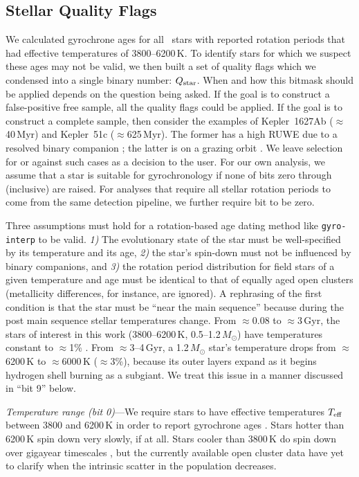 \documentclass[11pt,twocolumn,tighten]{aastex63}
\begin{document}
\subsection{Stellar Quality Flags}
\label{subsec:flags}
We calculated gyrochrone ages for all \nuniqstarsantosrotteffcut\
stars with reported rotation periods that had effective temperatures
of 3800--6200\,K.  To identify stars for which we suspect these ages
may not be valid, we then built a set of quality flags which we
condensed into a single binary number: $Q_{\rm star}$.  When and how
this bitmask should be applied depends on the question being asked.
If the goal is to construct a false-positive free sample, all the
quality flags could be applied.  If the goal is to construct a
complete sample, then consider the examples of Kepler~1627Ab
($\approx$40\,Myr) and Kepler~51c ($\approx$625\,Myr).  The former has
a high RUWE due to a resolved binary companion \citep{Bouma_2022a};
the latter is on a grazing orbit \citep{2014ApJ...783...53M}.  We
leave selection for or against such cases as a decision to the user.
For our own analysis, we assume that a star is suitable for
gyrochronology if none of bits zero through  (inclusive) are
raised.  For analyses that require all stellar rotation periods to
come from the same detection pipeline, we further require bit  to be
zero. 

Three assumptions must hold for a rotation-based age dating method
like \texttt{gyro-interp} to be valid.  {\it 1)} The evolutionary
state of the star must be well-specified by its temperature and its
age, {\it 2)} the star's spin-down must not be influenced by binary
companions, and {\it 3)} the rotation period distribution for field
stars of a given temperature and age must be identical to that of
equally aged open clusters (metallicity differences, for instance, are
ignored).  A rephrasing of the first condition is that the star must
be ``near the main sequence'' because during the post main sequence
stellar temperatures change.  From $\approx$0.08 to $\approx$3\,Gyr,
the stars of interest in this work (3800--6200\,K,
0.5--1.2\,$M_\odot$) have temperatures constant to $\approx$1\%
\citep{Choi_2016}.  From $\approx$3--4\,Gyr, a 1.2\,$M_\odot$ star's
temperature drops from $\approx$6200\,K to $\approx$6000\,K
($\approx$3\%), because its outer layers expand as it begins hydrogen
shell burning as a subgiant.  We treat this issue in a manner
discussed in ``bit 9'' below.

{\it Temperature range (bit 0)}---We require stars to have effective
temperatures $T_{\rm eff}$ between 3800 and 6200\,K in order to report
gyrochrone ages \citep{Bouma_2023}.   Stars hotter than 6200\,K spin
down very slowly, if at all.  Stars cooler than 3800\,K do spin down
over gigayear timescales
\citep{2016ApJ...821...93N,2023ApJ...954L..50E,2024arXiv240312129C},
but the currently available open cluster data have yet to clarify when
the intrinsic scatter in the population decreases.
\end{document}
